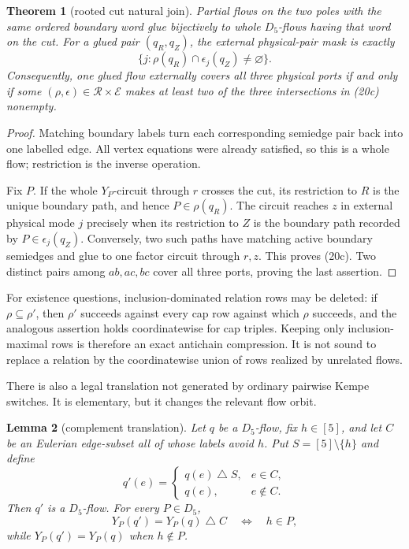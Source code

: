 \documentclass[11pt]{article}
\newtheorem{theorem}{Theorem}
\newtheorem{lemma}[theorem]{Lemma}
\theoremstyle{definition}
\theoremstyle{remark}
\begin{document}
\begin{theorem}[rooted cut natural join]\label{thm:rooted-cut-natural-join}
Partial flows on the two poles with the same ordered boundary word glue
bijectively to whole \(D_5\)-flows having that word on the cut.  For a glued
pair \((q_R,q_Z)\), the external physical-pair mask is exactly
\[
 \bigl\{j:\rho(q_R)\cap\epsilon_j(q_Z)\ne\varnothing\bigr\}. \tag{20c}
\]
Consequently, one glued flow externally covers all three physical ports if
and only if some \((\rho,\epsilon)\in\mathcal R\times\mathcal E\) makes at
least two of the three intersections in \emph{(20c)} nonempty.
\end{theorem}

\begin{proof}
Matching boundary labels turn each corresponding semiedge pair back into
one labelled edge.  All vertex equations were already satisfied, so this
is a whole flow; restriction is the inverse operation.

Fix \(P\).  If the whole \(Y_P\)-circuit through \(r\) crosses the cut, its
restriction to \(R\) is the unique boundary path, and hence
\(P\in\rho(q_R)\).  The circuit reaches \(z\) in external physical mode
\(j\) precisely when its restriction to \(Z\) is the boundary path recorded
by \(P\in\epsilon_j(q_Z)\).  Conversely, two such paths have matching
active boundary semiedges and glue to one factor circuit through \(r,z\).
This proves (20c).  Two distinct pairs among \(ab,ac,bc\) cover all three
ports, proving the last assertion.
\end{proof}

For existence questions, inclusion-dominated relation rows may be deleted:
if \(\rho\subseteq\rho'\), then \(\rho'\) succeeds against every cap row
against which \(\rho\) succeeds, and the analogous assertion holds
coordinatewise for cap triples.  Keeping only inclusion-maximal rows is
therefore an exact antichain compression.  It is not sound to replace a
relation by the coordinatewise union of rows realized by unrelated flows.

There is also a legal translation not generated by ordinary pairwise Kempe
switches.  It is elementary, but it changes the relevant flow orbit.

\begin{lemma}[complement translation]\label{lem:complement-translation}
Let \(q\) be a \(D_5\)-flow, fix \(h\in[5]\), and let \(C\) be an Eulerian
edge-subset all of whose labels avoid \(h\).  Put \(S=[5]\setminus\{h\}\)
and define
\[
 q'(e)=\begin{cases}q(e)\mathbin\triangle S,&e\in C,\\q(e),&e\notin C.
 \end{cases}                                                \tag{20d}
\]
Then \(q'\) is a \(D_5\)-flow.  For every \(P\in D_5\),
\[
             Y_P(q')=Y_P(q)\mathbin\triangle C
             \quad\Longleftrightarrow\quad h\in P,          \tag{20e}
\]
while \(Y_P(q')=Y_P(q)\) when \(h\notin P\).
\end{lemma}
\end{document}
